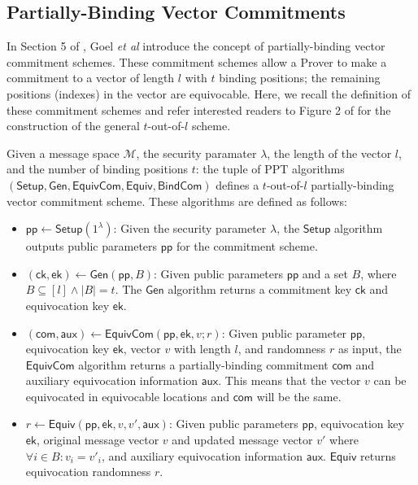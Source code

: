 \subsection{Partially-Binding Vector Commitments}
In Section 5 of \cite{StackingSigmas}, Goel {\em{et al}} introduce the concept of partially-binding vector commitment schemes. 
These commitment schemes allow a Prover to make a commitment to a vector of length $l$ with $t$ binding positions; 
the remaining positions (indexes) in the vector are equivocable. 
Here, we recall the definition of these commitment schemes and refer interested readers to Figure 2 of \cite{StackingSigmas} for the construction of the general $t$-out-of-$l$ 
scheme. 

\begin{definition}\label{def:comm_scheme}
  Given a message space $\mathcal M$, the security paramater $\lambda$, the length of the vector $l$, and the number of binding positions $t$: 
  the tuple of PPT algorithms $(\mathsf{Setup}, \mathsf{Gen}, \mathsf{EquivCom}, \mathsf{Equiv}, \mathsf{BindCom})$ defines a $t$-out-of-$l$ 
  partially-binding vector commitment scheme. These algorithms are defined as follows:
  \begin{itemize}
  \item $\mathsf{pp} \leftarrow \mathsf{Setup}(1^\lambda)$: Given the security parameter $\lambda$,
  the $\mathsf{Setup}$ algorithm outputs public parameters $\mathsf{pp}$ for the commitment scheme.
  \item $(\mathsf{ck},\mathsf{ek}) \leftarrow \mathsf{Gen}(\mathsf{pp},B)$: Given public parameters $\mathsf{pp}$ 
  and a set $B$, where $B \subseteq [l] \land |B| = t$. The $\mathsf{Gen}$ algorithm returns a commitment key $\mathsf{ck}$ and equivocation key $\mathsf{ek}$.

  \item $(\mathsf{com},\mathsf{aux}) \leftarrow \mathsf{EquivCom}(\mathsf{pp},\mathsf{ek},v;r)$: Given public parameter 
  $\mathsf{pp}$, equivocation key $\mathsf{ek}$, vector $v$ with length $l$, and randomness $r$ as input, the $\mathsf{EquivCom}$ algorithm returns a 
  partially-binding commitment $\mathsf{com}$ and auxiliary equivocation information $\mathsf{aux}$. This means that the vector $v$ can be equivocated in 
  equivocable locations and $\mathsf{com}$ will be the same.  

  \item $r \leftarrow \mathsf{Equiv}(\mathsf{pp},\mathsf{ek},v,v',\mathsf{aux})$: Given public parameters $\mathsf{pp}$, 
  equivocation key $\mathsf{ek}$, original message vector $v$ and updated message vector $v'$ 
  where $\forall i \in B: v_i = v'_i$, and auxiliary equivocation information $\mathsf{aux}$. $\mathsf{Equiv}$ returns equivocation 
  randomness $r$.


\end{itemize}
\end{definition}
